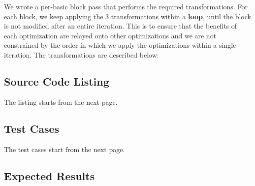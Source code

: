 We wrote a per-basic block pass that performs the required transformations. For each block, we keep
applying the 3 transformations within a \textbf{loop}, until the block is not modified after an entire iteration.
This is to ensure that the benefits of each optimization are relayed onto other optimizations and we
are not constrained by the order in which we apply the optimizations within a single iteration.
The transformations are described below:

\subsection{Source Code Listing}

The listing starts from the next page.



\subsection{Test Cases}

The test cases start from the next page.



\subsection{Expected Results}

